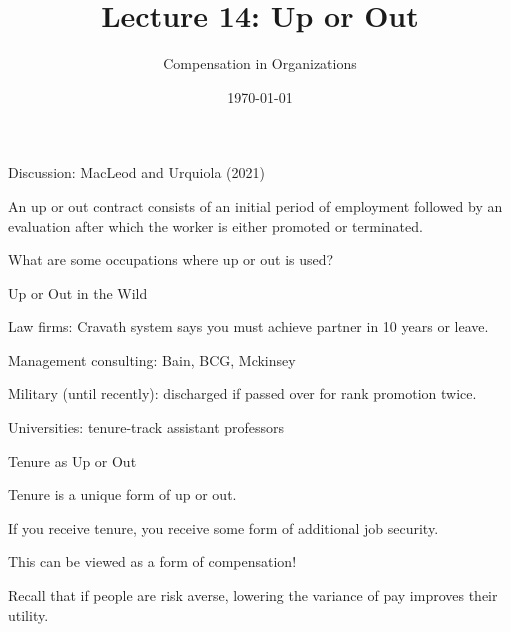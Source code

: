 \documentclass[aspectratio=169,usenames,dvipsnames]{beamer}
\title[diss]{Lecture 14: Up or Out} %
\author{Compensation in Organizations} %
\institute[shortinst]{Jacob Kohlhepp}
\date{\today} %
\newenvironment{wideitemize}{\itemize\addtolength{\itemsep}{10pt}}{\enditemize}
\begin{document}
\begin{frame}
\titlepage %

\end{frame}


\begin{frame}
\centering
    \huge Discussion: MacLeod and Urquiola (2021)

\end{frame}


\begin{frame}
\begin{definition}
    An up or out contract consists of an initial period of employment followed by an evaluation after which the worker is either promoted or terminated.
\end{definition}
\end{frame}

\begin{frame}
\centering
    \huge What are some occupations where up or out is used?

\end{frame}

\begin{frame}{Up or Out in the Wild}
\begin{wideitemize}
    \item Law firms: Cravath system says you must achieve partner in 10 years or leave.
    \item Management consulting: Bain, BCG, Mckinsey 
    \item Military (until recently): discharged if passed over for rank promotion twice.
    \item Universities: tenure-track assistant professors
\end{wideitemize}
    
\end{frame}
\begin{frame}{Tenure as Up or Out}

\begin{wideitemize}
    \item Tenure is a unique form of up or out.
    \item If you receive tenure, you receive some form of additional job security.
    \item This can be viewed as a form of compensation!
    \item Recall that if people are risk averse, lowering the variance of pay improves their utility.
\end{wideitemize}
    
\end{frame}
\end{document}
